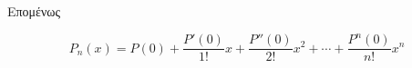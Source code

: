 \begin{enumerate}
\begin{solution}
		Επομένως 

		\[
			P_{n}(x) = P(0) + \frac{P'(0)}{1!} x + \frac{P''(0)}{2!} x^{2} + \cdots
			+ \frac{P^{n}(0)}{n!} x^{n}
		\]
  \end{solution}

\end{enumerate}
    


